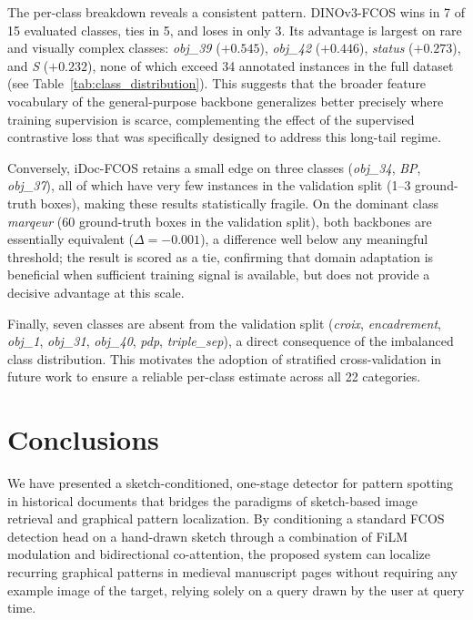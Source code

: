 \documentclass{iopjournal}
\begin{document}
The per-class breakdown reveals a consistent pattern.
DINOv3-FCOS wins in 7 of 15 evaluated classes, ties in 5, and loses in only 3.
Its advantage is largest on rare and visually complex classes:
\textit{obj\_39} ($+0.545$), \textit{obj\_42} ($+0.446$), \textit{status}
($+0.273$), and \textit{S} ($+0.232$), none of which exceed 34 annotated
instances in the full dataset (see Table~\ref{tab:class_distribution}).
This suggests that the broader feature vocabulary of the general-purpose
backbone generalizes better precisely where training supervision is scarce,
complementing the effect of the supervised contrastive loss that was
specifically designed to address this long-tail regime.

Conversely, iDoc-FCOS retains a small edge on three classes
(\textit{obj\_34}, \textit{BP}, \textit{obj\_37}), all of which have very
few instances in the validation split (1--3 ground-truth boxes), making
these results statistically fragile.
On the dominant class \textit{marqeur} (60 ground-truth boxes in the
validation split), both backbones are essentially equivalent ($\Delta = -0.001$),
a difference well below any meaningful threshold; the result is scored as a tie,
confirming that domain adaptation is beneficial when sufficient training
signal is available, but does not provide a decisive advantage at this scale.

Finally, seven classes are absent from the validation split
(\textit{croix}, \textit{encadrement}, \textit{obj\_1}, \textit{obj\_31},
\textit{obj\_40}, \textit{pdp}, \textit{triple\_sep}), a direct consequence
of the imbalanced class distribution.
This motivates the adoption of stratified cross-validation in future work
to ensure a reliable per-class estimate across all 22 categories.

\section{Conclusions}
 
We have presented a sketch-conditioned, one-stage detector for pattern spotting
in historical documents that bridges the paradigms of sketch-based image
retrieval and graphical pattern localization.
By conditioning a standard FCOS detection head on a hand-drawn sketch through
a combination of FiLM modulation and bidirectional co-attention, the proposed
system can localize recurring graphical patterns in medieval manuscript pages
without requiring any example image of the target, relying solely on a query
drawn by the user at query time.
 
\end{document}
